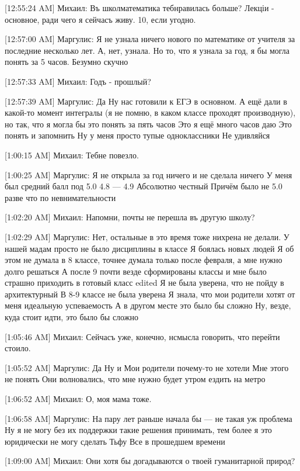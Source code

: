\documentclass{article}
\newcommand{\yat}{{\fontencoding{X2}\selectfont\cyryat}} %
\begin{document}
{[12:55:24 AM] Михаил:
Въ школ\yat математика теб\yat нравилась больше? 
Лекціи - основное, ради чего я сейчасъ живу. 10, если угодно.

[12:57:00 AM] Маргулис:
Я не узнала ничего нового по математике от учителя за последние несколько лет. А, нет, узнала. Но то, что я узнала за год, я бы могла понять за 5 часов.
 Безумно скучно

[12:57:33 AM] Михаил:
Годъ - прошлый?

[12:57:39 AM] Маргулис:
Да
 Ну нас готовили к ЕГЭ в основном. А ещё дали в какой-то момент интегралы (я не помню, в каком классе проходят производную), но так, что я могла бы это понять за пять часов
 Это я ещё много часов даю
 Это понять и запомнить
 Ну у меня просто тупые одноклассники
 Не удивляйся

[1:00:15 AM] Михаил:
Теб\yat не повезло.

[1:00:25 AM] Маргулис:
Я не открыла за год ничего и не сделала ничего
 У меня был средний балл под 5.0
 4.8 — 4.9
 Абсолютно честный
 Причём было не 5.0 разве что по невнимательности

[1:02:20 AM] Михаил:
Напомни, поч ты не перешла въ другую школу?

[1:02:29 AM] Маргулис:
Нет, остальные в это время тоже нихрена не делали. У нашей мадам просто не было дисциплины в классе
 Я боялась новых людей
 Я об этом не думала в 8 классе, точнее думала только после февраля, а мне нужно долго решаться
 А после 9 почти везде сформированы классы и мне было страшно приходить в готовый класс
edited 
Я не была уверена, что не пойду в архитектурный
 В 8-9 классе не была уверена
 Я знала, что мои родители хотят от меня идеальную успеваемость
 А в другом месте это было бы сложно
 Ну, везде, куда стоит идти, это было бы сложно

[1:05:46 AM] Михаил:
Сейчасъ уже, конечно, н смысла говорить, что перейти стоило.

[1:05:52 AM] Маргулис:
Да
 Ну и
 Мои родители почему-то не хотели
 Мне этого не понять
 Они волновались, что мне нужно будет утром ездить на метро

[1:06:52 AM] Михаил:
О, моя мама тоже.

[1:06:58 AM] Маргулис:
На пару лет раньше начала бы — не такая уж проблема
 Ну я не могу без их поддержки такие решения принимать, тем более я это юридически не могу сделать
 Тьфу
 Все в прошедшем времени

[1:09:00 AM] Михаил:
Они хотя бы догадываются о твоей гуманитарной природ\yat?

}
\end{document}
